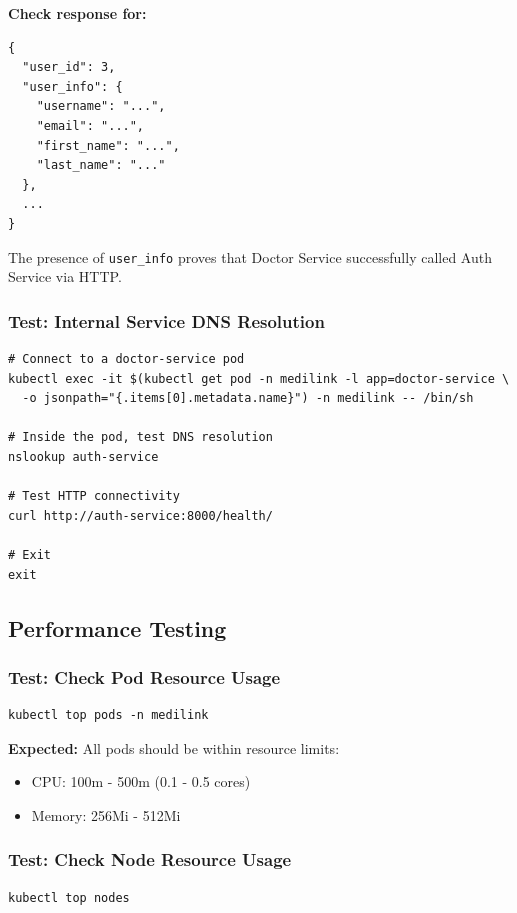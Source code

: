 \documentclass[12pt,a4paper]{article}
\begin{document}
\textbf{Check response for:}
\begin{lstlisting}[style=json]
{
  "user_id": 3,
  "user_info": {
    "username": "...",
    "email": "...",
    "first_name": "...",
    "last_name": "..."
  },
  ...
}
\end{lstlisting}

The presence of \texttt{user\_info} proves that Doctor Service successfully called Auth Service via HTTP.

\subsubsection{Test: Internal Service DNS Resolution}
\begin{lstlisting}[style=bash]
# Connect to a doctor-service pod
kubectl exec -it $(kubectl get pod -n medilink -l app=doctor-service \
  -o jsonpath="{.items[0].metadata.name}") -n medilink -- /bin/sh

# Inside the pod, test DNS resolution
nslookup auth-service

# Test HTTP connectivity
curl http://auth-service:8000/health/

# Exit
exit
\end{lstlisting}

\subsection{Performance Testing}

\subsubsection{Test: Check Pod Resource Usage}
\begin{lstlisting}[style=bash]
kubectl top pods -n medilink
\end{lstlisting}

\textbf{Expected:} All pods should be within resource limits:
\begin{itemize}
    \item CPU: 100m - 500m (0.1 - 0.5 cores)
    \item Memory: 256Mi - 512Mi
\end{itemize}

\subsubsection{Test: Check Node Resource Usage}
\begin{lstlisting}[style=bash]
kubectl top nodes
\end{lstlisting}
\end{document}
